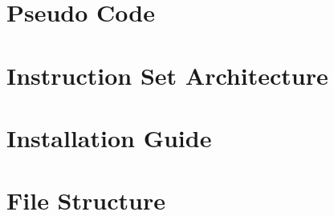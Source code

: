 \documentclass[a4paper,10pt,twoside]{report}
\begin{document}


%



\begin{appendices}
\chapter{Pseudo Code}\label{appendix:A}

\chapter{Instruction Set Architecture}\label{appendix:isa}

\chapter{Installation Guide}\label{appendix:C}

\chapter{File Structure}\label{appendix:D}

\end{appendices}

\end{document}
